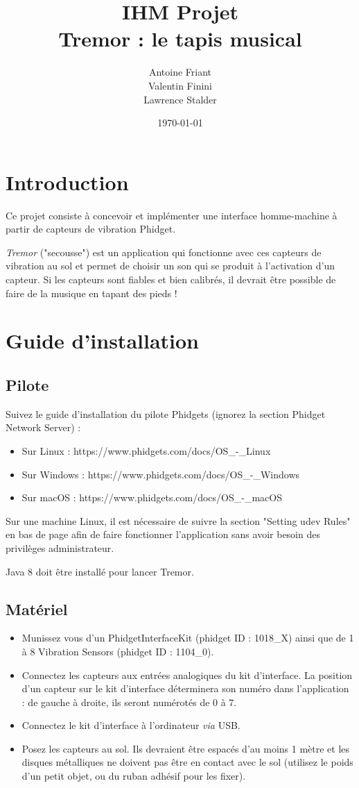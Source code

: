 \documentclass[11pt,a4paper,twoside,svgnames]{article}
\title{\color{DarkGreen}\huge\bfseries IHM Projet\\Tremor : le tapis musical}
\author{Antoine Friant\\Valentin Finini\\Lawrence Stalder}
\date{\today}
\begin{document}
	
	\maketitle
	
	
	\section{Introduction}
	Ce projet consiste à concevoir et implémenter une interface homme-machine à partir de capteurs de vibration Phidget.
	
	\textit{Tremor} ("secousse") est un application qui fonctionne avec ces capteurs de vibration au sol et permet de choisir un son qui se produit à l'activation d'un capteur. Si les capteurs sont fiables et bien calibrés, il devrait être possible de faire de la musique en tapant des pieds !
	
	\section{Guide d'installation}
	
	\subsection{Pilote}
	Suivez le guide d'installation du pilote Phidgets (ignorez la section Phidget Network Server) :
	\begin{itemize}
		\item Sur Linux : https://www.phidgets.com/docs/OS\_-\_Linux
		\item Sur Windows : https://www.phidgets.com/docs/OS\_-\_Windows
		\item Sur macOS : https://www.phidgets.com/docs/OS\_-\_macOS
	\end{itemize}

	Sur une machine Linux, il est nécessaire de suivre la section "Setting udev Rules" en bas de page afin de faire fonctionner l'application sans avoir besoin des privilèges administrateur.
	
	Java 8 doit être installé pour lancer Tremor.
	
	\subsection{Matériel}
	\begin{itemize}
		\item Munissez vous d'un PhidgetInterfaceKit (phidget ID : 1018\_X) ainsi que de 1 à 8 Vibration Sensors (phidget ID : 1104\_0).
		\item Connectez les capteurs aux entrées analogiques du kit d'interface. La position d'un capteur sur le kit d'interface déterminera son numéro dans l'application : de gauche à droite, ils seront numérotés de 0 à 7.
		\item Connectez le kit d'interface à l'ordinateur \textit{via} USB.
		\item Posez les capteurs au sol. Ils devraient être espacés d'au moins 1 mètre et les disques métalliques ne doivent pas être en contact avec le sol (utilisez le poids d'un petit objet, ou du ruban adhésif pour les fixer).
	\end{itemize}
\end{document}
